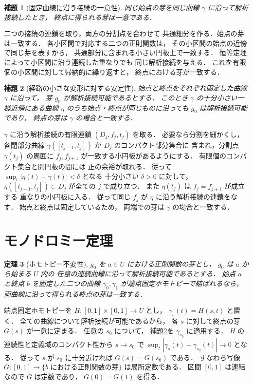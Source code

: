 \documentclass[a5paper,10pt,onecolumn]{jsarticle}
\makeatletter
\theoremstyle{mathnotetheorem}
\newtheorem{theorem}{定理}[section]
\newtheorem{lemma}[theorem]{補題}
\renewcommand{\proofname}{証明}
\renewenvironment{proof}[1][\proofname]{%
  \par\pushQED{\qed}\normalfont\topsep4\p@\@plus2\p@\relax
  \trivlist\item[\hskip\labelsep\bfseries #1]\ignorespaces
}{\popQED\endtrivlist\@endpefalse}
\makeatother
\begin{document}
\begin{lemma}[固定曲線に沿う接続の一意性]
\label{lem:path-unique}
同じ始点の芽を同じ曲線 $\gamma$ に沿って解析接続したとき，
終点に得られる芽は一意である．
\end{lemma}
\begin{proof}
二つの接続の連鎖を取り，両方の分割点を合わせて
共通細分を作る．始点の芽は一致する．
各小区間で対応する二つの正則関数は，
その小区間の始点の近傍で同じ芽を表すから，
共通部分に含まれる小さい円板上で一致する．
恒等定理によって小区間に沿う連続した重なりでも
同じ解析接続を与える．
これを有限個の小区間に対して帰納的に繰り返すと，
終点における芽が一致する．
\end{proof}

\begin{lemma}[経路の小さな変形に対する安定性]
\label{lem:path-stability}
始点と終点をそれぞれ固定した曲線 $\gamma$ に沿って，
芽 $g_0$ が解析接続可能であるとする．
このとき $\gamma$ の十分小さい一様近傍にある曲線
$\eta$ のうち始点・終点が同じものに沿っても
$g_0$ は解析接続可能であり，
終点の芽は $\gamma$ の場合と一致する．
\end{lemma}
\begin{proof}
$\gamma$ に沿う解析接続の有限連鎖
$(D_j,f_j,t_j)$ を取る．
必要なら分割を細かくし，
各閉部分曲線
$\gamma([t_{j-1},t_j])$ が $D_j$ のコンパクト部分集合に
含まれ，分割点 $\gamma(t_j)$ の周囲に
$f_j,f_{j+1}$ が一致する小円板があるようにする．
有限個のコンパクト集合と開円板の間には
正の余裕が取れる．
従って $\sup_t|\eta(t)-\gamma(t)|<\delta$ となる
十分小さい $\delta>0$ に対して，
$\eta([t_{j-1},t_j])\subset D_j$ が全ての $j$ で成り立つ．
また $\eta(t_j)$ は $f_j=f_{j+1}$ が成立する
重なりの小円板に入る．
従って同じ $f_j$ が $\eta$ に沿う解析接続の連鎖をなす．
始点と終点は固定しているため，
両端での芽は $\gamma$ の場合と一致する．
\end{proof}

\section{モノドロミー定理}

\begin{theorem}[ホモトピー不変性]\label{thm:homotopy}
$g_0$ を $a\in U$ における正則関数の芽とし，
$g_0$ は $a$ から始まる $U$ 内の
\emph{任意の連続曲線に沿って解析接続可能}であるとする．
始点 $a$ と終点 $b$ を固定した二つの曲線
$\gamma_0,\gamma_1$ が端点固定ホモトピーで結ばれるなら，
両曲線に沿って得られる終点の芽は一致する．
\end{theorem}
\begin{proof}
端点固定ホモトピーを
$H:[0,1]\times[0,1]\to U$ とし，
$\gamma_s(t)=H(s,t)$ と置く．
全ての曲線について解析接続が可能であるから，
各 $s$ に対して終点の芽 $G(s)$ が一意に定まる．
任意の $s_0$ について，
補題\ref{lem:path-stability}を $\gamma_{s_0}$ に適用する．
$H$ の連続性と定義域のコンパクト性から
$s\to s_0$ で
$\sup_t|\gamma_s(t)-\gamma_{s_0}(t)|\to0$
となる．
従って $s$ が $s_0$ に十分近ければ
$G(s)=G(s_0)$ である．
すなわち写像 $G:[0,1]\to
 \{\text{$b$ における正則関数の芽}\}$
は局所定数である．
区間 $[0,1]$ は連結なので $G$ は定数であり，
$G(0)=G(1)$ を得る．
\end{proof}
\end{document}
